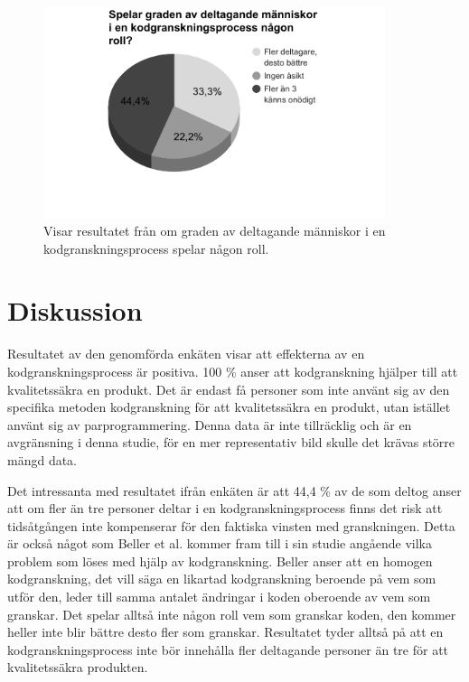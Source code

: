 \begin{figure}[H]
	\centering
	\includegraphics[width=100mm]{figures/grade_participation.png}
	\caption{Visar resultatet från om graden av deltagande människor i en kodgranskningsprocess spelar någon roll.}
	\label{fig:grade_participation}
\end{figure}

\section{Diskussion}
\label{sec:discussion-wallstrom}
Resultatet av den genomförda enkäten visar att effekterna av en kodgranskningsprocess är positiva. 100 \% anser att kodgranskning hjälper till att kvalitetssäkra en produkt. Det är endast få personer som inte använt sig av den specifika metoden kodgranskning för att kvalitetssäkra en produkt, utan istället använt sig av parprogrammering. Denna data är inte tillräcklig och är en avgränsning i denna studie, för en mer representativ bild skulle det krävas större mängd data. 

Det intressanta med resultatet ifrån enkäten är att 44,4 \% av de som deltog anser att om fler än tre personer deltar i en kodgranskningsprocess finns det risk att tidsåtgången inte kompenserar för den faktiska vinsten med granskningen. Detta är också något som Beller et al. \cite{beller2014modern} kommer fram till i sin studie angående vilka problem som löses med hjälp av kodgranskning. Beller anser att en homogen kodgranskning, det vill säga en likartad kodgranskning beroende på vem som utför den, leder till samma antalet ändringar i koden oberoende av vem som granskar. Det spelar alltså inte någon roll vem som granskar koden, den kommer heller inte blir bättre desto fler som granskar. Resultatet tyder alltså på att en kodgranskningsprocess inte bör innehålla fler deltagande personer än tre för att kvalitetssäkra produkten. 

